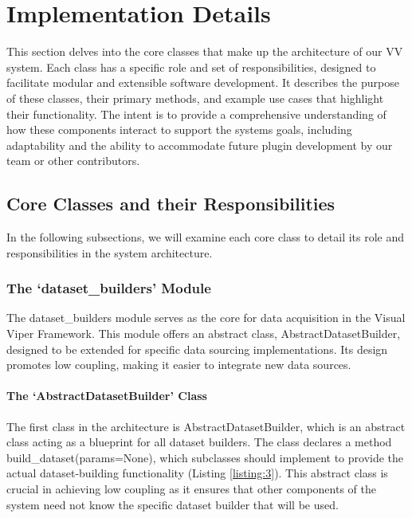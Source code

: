 \section{Implementation Details}\label{implementation-details}

This section delves into the core classes that make up the architecture
of our VV system. Each class has a specific role and set of
responsibilities, designed to facilitate modular and extensible software
development. It describes the purpose of these classes, their primary
methods, and example use cases that highlight their functionality. The
intent is to provide a comprehensive understanding of how these
components interact to support the system\textquotesingle s goals,
including adaptability and the ability to accommodate future plugin
development by our team or other contributors.

\subsection{Core Classes and their
Responsibilities}\label{core-classes-and-their-responsibilities}

In the following subsections, we will examine each core class to detail
its role and responsibilities in the system architecture.

\subsubsection{The `dataset\_builders'
Module}\label{the-dataset_builders-module}

The dataset\_builders module serves as the core for data acquisition in
the Visual Viper Framework. This module offers an abstract class,
AbstractDatasetBuilder, designed to be extended for specific data
sourcing implementations. Its design promotes low coupling, making it
easier to integrate new data sources.

\paragraph{The `AbstractDatasetBuilder'
Class}\label{the-abstractdatasetbuilder-class}

The first class in the architecture is AbstractDatasetBuilder, which is
an abstract class acting as a blueprint for all dataset builders. The
class declares a method build\_dataset(params=None), which subclasses
should implement to provide the actual dataset-building functionality
(Listing \ref{listing:3}). This abstract class is crucial in achieving low coupling as
it ensures that other components of the system need not know the
specific dataset builder that will be used.

